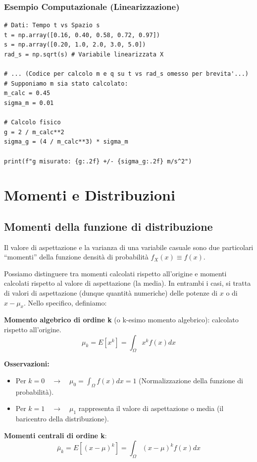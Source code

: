 \documentclass[openany,a4paper,12pt]{book}
\theoremstyle{remark}
\begin{document}
\subsubsection*{Esempio Computazionale (Linearizzazione)}
\begin{lstlisting}[caption={Linearizzazione per calcolo di g}]
# Dati: Tempo t vs Spazio s
t = np.array([0.16, 0.40, 0.58, 0.72, 0.97]) 
s = np.array([0.20, 1.0, 2.0, 3.0, 5.0])
rad_s = np.sqrt(s) # Variabile linearizzata X

# ... (Codice per calcolo m e q su t vs rad_s omesso per brevita'...)
# Supponiamo m sia stato calcolato:
m_calc = 0.45 
sigma_m = 0.01

# Calcolo fisico
g = 2 / m_calc**2
sigma_g = (4 / m_calc**3) * sigma_m

print(f"g misurato: {g:.2f} +/- {sigma_g:.2f} m/s^2")
\end{lstlisting}







\section{Momenti e Distribuzioni}


\subsection{Momenti della funzione di distribuzione}



Il valore di aspettazione e la varianza di una variabile casuale sono due particolari “momenti” della funzione densità di probabilità $f_X(x) \equiv f(x)$.

Possiamo distinguere tra momenti calcolati rispetto all’origine e momenti calcolati rispetto al valore di aspettazione (la media). In entrambi i casi, si tratta di valori di aspettazione (dunque quantità numeriche) delle potenze di $x$ o di $x-\mu_x$. 
Nello specifico, definiamo:
   
\begin{definizione} \textbf{Momento algebrico di ordine k} (o k-esimo momento algebrico): calcolato rispetto all'origine.
\[
\mu_k=E[x^k]=\int_\Omega x^k f(x) dx
\]
\end{definizione}

\textbf{Osservazioni:}
\begin{itemize}
    \item Per $k=0 \quad \to \quad  \mu_0 =\int_\Omega f(x) dx =1$ (Normalizzazione della funzione di probabilità).
    \item Per $k=1 \quad \to \quad \mu_1$ rappresenta il valore di aspettazione o media (il baricentro della distribuzione).
\end{itemize}
\begin{definizione}
\textbf{Momenti centrali di ordine k}:
\[
\bar{\mu}_k=E[(x-\mu)^k]=\int_\Omega (x-\mu)^k f(x) dx
\]
\end{definizione}
\end{document}
